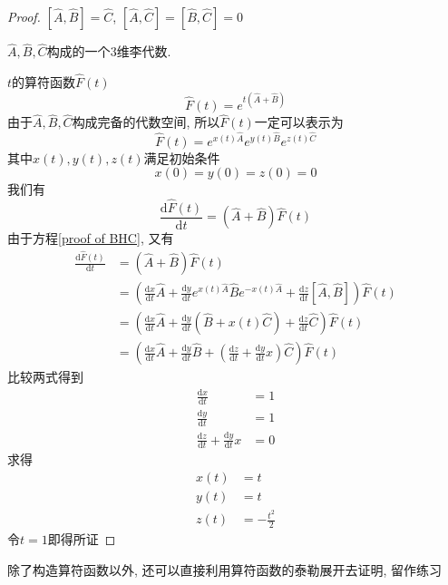 \documentclass[a4paper,11pt]{book}
\newtheorem{proof}{证明}[section]
\newcommand{\A}{\hat{A}}
\newcommand{\B}{\hat{B}}
\newcommand{\hC}{\hat{C}}
\newcommand{\md}{\mathrm{d}}
\begin{document}
\begin{proof}
  $[\A,\B]=\hC$, $[\A,\hC]=[\B,\hC]=0$

  $\A,\B,\hC$构成的一个$3$维李代数.

  $t$的算符函数$\hat{F}(t)$
  \begin{equation*}
    \hat{F}(t)=e^{t(\A+\B)}
  \end{equation*}
  由于$\A,\B,\hC$构成完备的代数空间, 所以$\hat{F}(t)$一定可以表示为
  \begin{equation}\label{proof of BHC}
    \hat{F}(t)=e^{x(t)\A}e^{y(t)\B}e^{z(t)\hC}
  \end{equation}
  其中$x(t),y(t),z(t)$满足初始条件
  \begin{equation*}
    x(0)=y(0)=z(0)=0
  \end{equation*}
  我们有
  \begin{equation*}
    \frac{\mathrm{d}\hat{F}(t)}{\mathrm{d}t}=(\A+\B)\hat{F}(t)
  \end{equation*}
  由于方程\eqref{proof of BHC}, 又有
  \begin{equation*}
    \begin{split}
       \frac{\mathrm{d}\hat{F}(t)}{\mathrm{d}t}&=(\A+\B)\hat{F}(t)\\
         &=\left(\frac{\md x}{\md t}\A+\frac{\md y}{\md t}e^{x(t)\A}\B e^{-x(t)\A}+\frac{\md z}{\md t}[\A,\B]\right)\hat{F}(t)\\
         &=\left(\frac{\md x}{\md t}\A+\frac{\md y}{\md t}(\B+x(t)\hC)+\frac{\md z}{\md t}\hC\right)\hat{F}(t)\\
         &=\left(\frac{\md x}{\md t}\A+\frac{\md y}{\md t}\B+(\frac{\md z}{\md t}+\frac{\md y}{\md t}x)\hC\right)\hat{F}(t)
    \end{split}
  \end{equation*}
  比较两式得到
  \begin{equation*}
    \begin{split}
       \frac{\md x}{\md t} & =1 \\
       \frac{\md y}{\md t} & =1 \\
       \frac{\md z}{\md t}+\frac{\md y}{\md t}x& =0
    \end{split}
  \end{equation*}
  求得
  \begin{equation*}
    \begin{split}
       x(t) & =t \\
       y(t) & =t \\
       z(t) & =-\frac{t^2}{2}
    \end{split}
  \end{equation*}
  令$t=1$即得所证
\end{proof}
除了构造算符函数以外, 还可以直接利用算符函数的泰勒展开去证明, 留作练习
\end{document}
